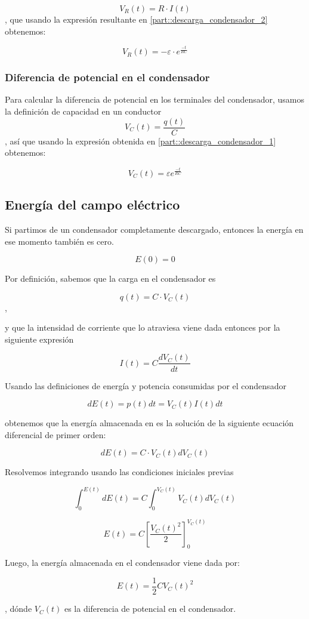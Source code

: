 \documentclass[../main.tex]{subfiles}
\begin{document}
$$V_R(t) = R \cdot I(t)$$
, que usando la expresión resultante en \ref{part::descarga_condensador_2} obtenemos:

\begin{equation}
    V_R(t) = -\varepsilon \cdot e^{\frac{-t}{RC}}
\end{equation}


\subsubsection{Diferencia de potencial en el condensador}
\label{part::descarga_condensador_4}
Para calcular la diferencia de potencial en los terminales del condensador, usamos la definición de capacidad en un conductor
$$V_C(t) = \frac{q(t)}{C}$$
, así que usando la expresión obtenida en \ref{part::descarga_condensador_1} obtenemos:

\begin{equation}
    V_C(t) = \varepsilon  e^{\frac{-t}{RC}}
\end{equation}



\subsection{Energía del campo eléctrico}
\label{part::energia_condensador}
Si partimos de un condensador completamente descargado, entonces la energía en ese momento también es cero.

$$E(0) = 0$$

Por definición, sabemos que la carga en el condensador es

$$q(t) = C \cdot V_C(t)$$, 

y que la intensidad de corriente que lo atraviesa viene dada entonces por la siguiente expresión

$$I(t) = C \frac{d V_C(t)}{d t}$$

Usando las definiciones de energía y potencia consumidas por el condensador

$$d E(t) = p(t)  d t = V_C(t) I(t) d t $$

obtenemos que la energía almacenada en es la solución de la siguiente ecuación diferencial de primer orden:

$$d E(t) = C \cdot V_C(t) d V_C(t)$$

Resolvemos integrando usando las condiciones iniciales previas

$$\int_{0}^{E(t)} d E(t) = C \int_{0}^{V_C(t)} V_C(t) d V_C(t) $$

$$E(t) = C \left[ \frac{V_C(t)^2}{2} \right]_{0}^{V_C(t)}$$

Luego, la energía almacenada en el condensador viene dada por:

\begin{equation}
    E(t) = \frac{1}{2}CV_C(t)^2
\end{equation}

, dónde $V_C(t)$ es la diferencia de potencial en el condensador.
\end{document}
